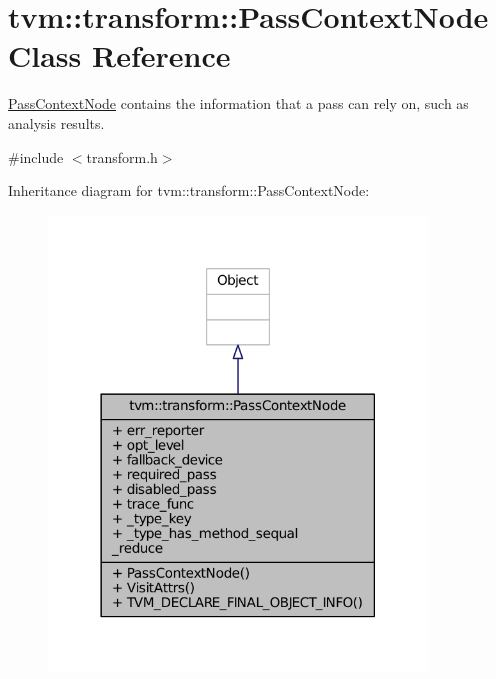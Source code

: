 \hypertarget{classtvm_1_1transform_1_1PassContextNode}{}\section{tvm\+:\+:transform\+:\+:Pass\+Context\+Node Class Reference}
\label{classtvm_1_1transform_1_1PassContextNode}


\hyperlink{classtvm_1_1transform_1_1PassContextNode}{Pass\+Context\+Node} contains the information that a pass can rely on, such as analysis results.  




{\ttfamily \#include $<$transform.\+h$>$}



Inheritance diagram for tvm\+:\+:transform\+:\+:Pass\+Context\+Node\+:
\nopagebreak
\begin{figure}[H]
\begin{center}
\leavevmode
\includegraphics[width=285pt]{classtvm_1_1transform_1_1PassContextNode__inherit__graph}
\end{center}
\end{figure}


